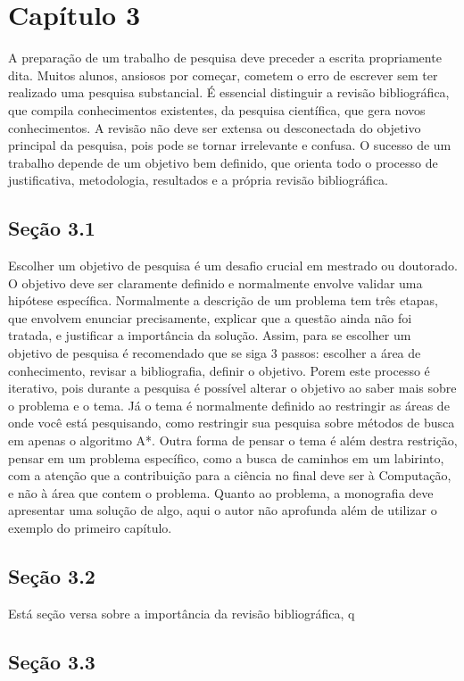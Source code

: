 \documentclass[
	12pt,				%
	openright,			%
	oneside,			%
	a4paper,			%
	chapter=TITLE,		%
	subsection=TITLE,	%
	english,			%
	brazilian,				%
	]{abntex2}
\begin{document}
\section*{Capítulo 3}
A preparação de um trabalho de pesquisa deve preceder a escrita propriamente dita. Muitos alunos, ansiosos por começar, cometem o erro de escrever sem ter realizado uma pesquisa substancial. É essencial distinguir a revisão bibliográfica, que compila conhecimentos existentes, da pesquisa científica, que gera novos conhecimentos. A revisão não deve ser extensa ou desconectada do objetivo principal da pesquisa, pois pode se tornar irrelevante e confusa. O sucesso de um trabalho depende de um objetivo bem definido, que orienta todo o processo de justificativa, metodologia, resultados e a própria revisão bibliográfica.

\subsection*{Seção 3.1}
Escolher um objetivo de pesquisa é um desafio crucial em mestrado ou doutorado. O objetivo deve ser claramente definido e normalmente envolve validar uma hipótese específica.
Normalmente a descrição de um problema tem três etapas, que envolvem enunciar precisamente, explicar que a questão ainda não foi tratada, e justificar a importância da solução.
Assim, para se escolher um objetivo de pesquisa é recomendado que se siga 3 passos: escolher a área de conhecimento, revisar a bibliografia, definir o objetivo. Porem este processo é iterativo, pois durante a pesquisa é possível alterar o objetivo ao saber mais sobre o problema e o tema.
Já o tema é normalmente definido ao restringir as áreas de onde você está pesquisando, como restringir sua pesquisa sobre métodos de busca em apenas o algoritmo A*. Outra forma de pensar o tema é além destra restrição, pensar em um problema específico, como a busca de caminhos em um labirinto, com a atenção que a contribuição para a ciência no final deve ser à Computação, e não à área que contem o problema.
Quanto ao problema, a monografia deve apresentar uma solução de algo, aqui o autor não aprofunda além de utilizar o exemplo do primeiro capítulo.
\subsection*{Seção 3.2}
Está seção versa sobre a importância da revisão bibliográfica, q

\subsection*{Seção 3.3}
\end{document}
